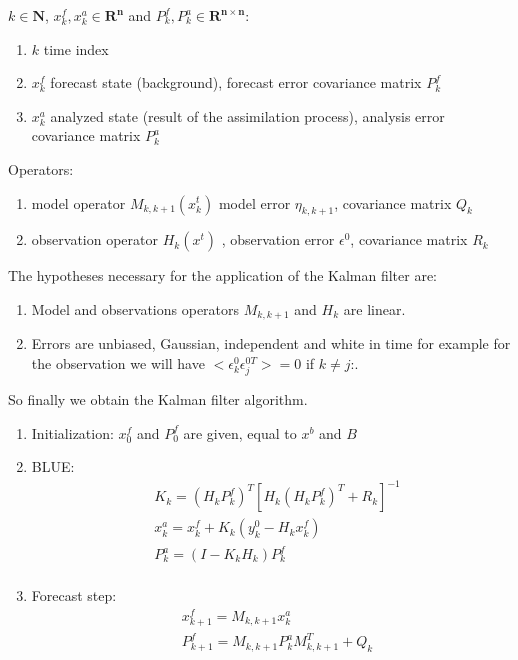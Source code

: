 \noindent $k\in \mathbf{N}$, $x_k^f ,x_k^a\in \mathbf{R^n}$ and $P_k^f,P_k^a \in \mathbf{R^{n\times n}}$:
 \begin{enumerate}[label=\textbullet]
		\item $k$ time index
		\item $x_{k}^{f}$ forecast state (background), forecast error covariance matrix $P_{k}^{f}$
		\item $x_{k}^{a}$ analyzed state (result of the assimilation process), analysis error covariance matrix $P_{k}^{a}$
	\end{enumerate}
\noindent Operators:
    \begin{enumerate}[label=\textbullet]
		\item model operator $ M_{k,k+1}(x_{k}^{t}) $ model error $\eta
		_{k,k+1}$, covariance matrix $Q_k$
		\item observation operator $ H_k (x^t ) $ , observation error $\epsilon^0$, covariance matrix $R_k$
	\end{enumerate}
\noindent The hypotheses necessary for the application of the Kalman filter are:
    \begin{enumerate}[label=\textbullet]
		\item Model and observations operators $M_{k,k+1}$ and $H_k$ are linear.
		\item Errors are unbiased, Gaussian, independent and white in time for example for the observation we will have $<\epsilon_k^0\epsilon_j^{0T}>=0$ if $k\ne j$:.
	\end{enumerate}
So finally we obtain the Kalman filter algorithm.
\begin{enumerate}[label=(\roman*)]
\item Initialization: $x_0^f$ and $P_0^f$ are given, equal to $x^b$ and $B$
\item BLUE:
$$\begin{aligned} &K_k=(H_kP_k^f)^T[H_k(H_kP_k^f)^T+R_k]^{-1} \\
&x_k^a=x_k^f+K_k(y_k^0-H_kx_k^f) \\
&P_k^a=(I-K_kH_k)P_k^f \\
\end{aligned}$$
\item Forecast step:
$$\begin{aligned} 
&x_{k+1}^f=M_{k,k+1}x_k^a \\
&P_{k+1}^f=M_{k,k+1}P_k^aM_{k,k+1}^T+Q_k\\
\end{aligned}$$
\end{enumerate}



